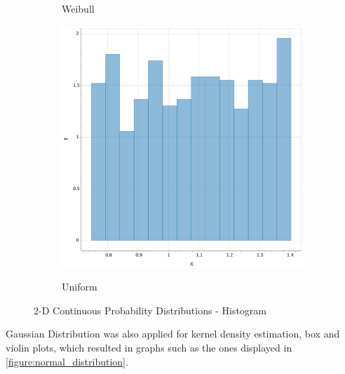 \begin{figure}
\begin{subfigure}[b]{0.19\textwidth}
        \label{figure: weibull_hist}
        \caption{Weibull}
    \end{subfigure}
    \hfill
    \begin{subfigure}[b]{0.19\textwidth}
        \centering
        \includegraphics[width=\textwidth]{figures/body/methodology/uniform_hist.png}
        \label{figure: uniform_hist}
        \caption{Uniform}
    \end{subfigure}
    \caption{2-D Continuous Probability Distributions - Histogram}
    \label{figure:histogram_distributions}
\end{figure}

Gaussian Distribution was also applied for kernel density estimation, box and violin plots, which resulted in graphs such as the ones displayed in \autoref{figure:normal_distribution}.

\hfill

